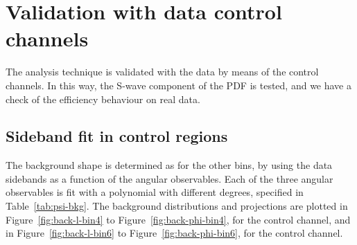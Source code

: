 


\section{Validation with data control channels}
\label{sec:controlchannel}

The analysis technique is validated with the data by means of the control channels.
In this way, the S-wave component of the PDF is tested, and we have a check of the efficiency behaviour on real data.

\subsection{Sideband fit in control regions}
\label{sec:bkgforcc}

The background shape is determined as for the other bins, by using the data sidebands as a function of the angular observables.
Each of the three angular observables is fit with a polynomial with different degrees, specified in Table~\ref{tab:psi-bkg}.
The background distributions and \pdf projections are plotted in Figure~\ref{fig:back-l-bin4} to Figure~\ref{fig:back-phi-bin4}, for the \BtoKstJpsi control channel, and in Figure~\ref{fig:back-l-bin6} to Figure~\ref{fig:back-phi-bin6}, for the \BtoKstpsip control channel.

